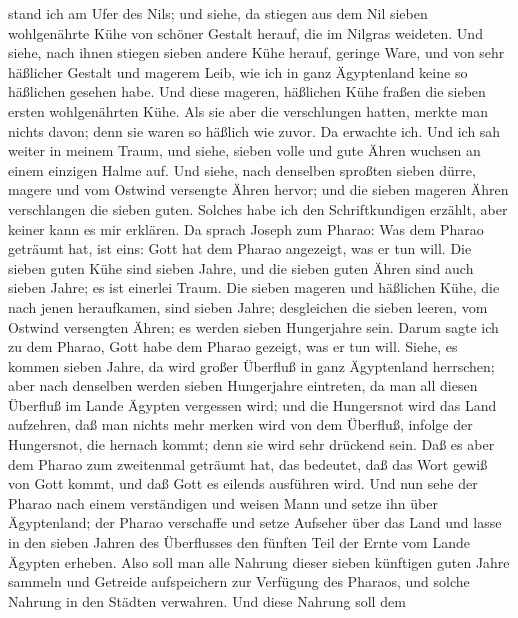 stand ich am Ufer des Nils;  und siehe, da stiegen aus
dem Nil sieben wohlgenährte Kühe von schöner Gestalt herauf, die im
Nilgras weideten.  Und siehe, nach ihnen stiegen sieben
andere Kühe herauf, geringe Ware, und von sehr häßlicher Gestalt und
magerem Leib, wie ich in ganz Ägyptenland keine so häßlichen gesehen
habe.  Und diese mageren, häßlichen Kühe fraßen die
sieben ersten wohlgenährten Kühe.  Als sie aber die
verschlungen hatten, merkte man nichts davon; denn sie waren so häßlich
wie zuvor. Da erwachte ich.  Und ich sah weiter in meinem
Traum, und siehe, sieben volle und gute Ähren wuchsen an einem einzigen
Halme auf.  Und siehe, nach denselben sproßten sieben
dürre, magere und vom Ostwind versengte Ähren hervor; 
und die sieben mageren Ähren verschlangen die sieben guten. Solches habe
ich den Schriftkundigen erzählt, aber keiner kann es mir erklären.
 Da sprach Joseph zum Pharao: Was dem Pharao geträumt
hat, ist eins: Gott hat dem Pharao angezeigt, was er tun will.
 Die sieben guten Kühe sind sieben Jahre, und die sieben
guten Ähren sind auch sieben Jahre; es ist einerlei Traum.
 Die sieben mageren und häßlichen Kühe, die nach jenen
heraufkamen, sind sieben Jahre; desgleichen die sieben leeren, vom
Ostwind versengten Ähren; es werden sieben Hungerjahre sein.
 Darum sagte ich zu dem Pharao, Gott habe dem Pharao
gezeigt, was er tun will.  Siehe, es kommen sieben Jahre,
da wird großer Überfluß in ganz Ägyptenland herrschen; 
aber nach denselben werden sieben Hungerjahre eintreten, da man all
diesen Überfluß im Lande Ägypten vergessen wird;  und die
Hungersnot wird das Land aufzehren, daß man nichts mehr merken wird von
dem Überfluß, infolge der Hungersnot, die hernach kommt; denn sie wird
sehr drückend sein.  Daß es aber dem Pharao zum
zweitenmal geträumt hat, das bedeutet, daß das Wort gewiß von Gott
kommt, und daß Gott es eilends ausführen wird.  Und nun
sehe der Pharao nach einem verständigen und weisen Mann und setze ihn
über Ägyptenland;  der Pharao verschaffe und setze
Aufseher über das Land und lasse in den sieben Jahren des Überflusses
den fünften Teil der Ernte vom Lande Ägypten erheben. 
Also soll man alle Nahrung dieser sieben künftigen guten Jahre sammeln
und Getreide aufspeichern zur Verfügung des Pharaos, und solche Nahrung
in den Städten verwahren.  Und diese Nahrung soll dem
